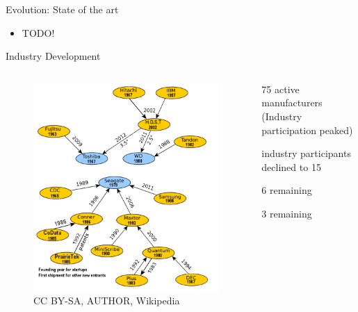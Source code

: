 \documentclass[12pt]{beamer}
\newlength{\wideitemsep}
\let\olditem\item
\renewcommand{\item}{\setlength{\itemsep}{\wideitemsep}\olditem}
\begin{document}
\begin{frame}[fragile]{Evolution: State of the art}
	\begin{itemize}
		\item TODO!
	\end{itemize}
\end{frame}

\begin{frame}[fragile]{Industry Development}

	\begin{columns}[c]
	\begin{column}[c]{.5\textwidth}	
 		\begin{figure}[p]
	 		\centering
	 		\includegraphics[width=\linewidth]{img/diagram_manufacturer.png}
	 			\caption{CC BY-SA, AUTHOR, Wikipedia}
 		\end{figure}
 	\end{column}
 	
 	\begin{column}[c]{.5\textwidth}	
 		\begin{description}
 			\item[1985] 75 active manufacturers (Industry participation peaked)
			\item[1999] industry participants declined to 15
			\item[2009] 6 remaining
			\item[2012] 3 remaining
 		\end{description}
 	\end{column}
 	\end{columns}
 	
\end{frame}
\end{document}
